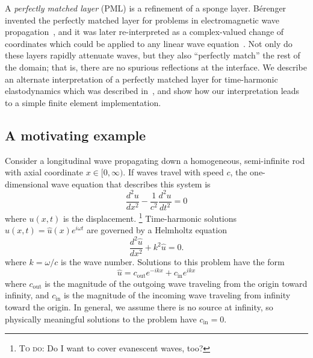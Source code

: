 \documentclass{article}
\newcommand{\note}[1]{\footnote{\textsc{To do}: #1}}
\begin{document}
A \emph{perfectly matched layer} (PML) is a refinement of a sponge
layer.  B{\'e}renger invented the perfectly matched layer for problems
in electromagnetic wave propagation~\cite{Berenger:1994:PML}, and it
was later re-interpreted as a complex-valued change of coordinates
which could be applied to any linear wave
equation~\cite{Turkel:1998:APB,Teixeira:2000:CSA}.  Not only do these
layers rapidly attenuate waves, but they also ``perfectly match'' the
rest of the domain; that is, there are no spurious reflections at the
interface.  We describe an alternate interpretation of a perfectly
matched layer for time-harmonic elastodynamics which was described
in~\cite{Basu:2003:PML}, and show how our interpretation leads to a
simple finite element implementation.



\subsection{A motivating example}

Consider a longitudinal wave propagating down a homogeneous,
semi-infinite rod with axial coordinate $x \in [0, \infty)$.  If waves
travel with speed $c$, the one-dimensional wave equation that
describes this system is
\begin{equation}
  \frac{d^2 u}{dx^2} - \frac{1}{c^2} \frac{d^2 u}{dt^2} = 0
\end{equation}
where $u(x,t)$ is the displacement.
\note{
  Do I want to cover evanescent waves, too?
}
Time-harmonic solutions $u(x,t) = \hat{u}(x) e^{i \omega t}$
are governed by a Helmholtz equation
\begin{equation}
  \label{helmholtz-eq-1d}
  \frac{d^2 \hat{u}}{dx^2} + k^2 \hat{u} = 0.
\end{equation}
where $k = \omega/c$ is the wave number.  Solutions to this problem
have the form
\begin{equation}
  \hat{u} = c_{\mathrm{out}} e^{-ikx} + c_{\mathrm{in}} e^{ikx}
\end{equation}
where $c_{\mathrm{out}}$ is the magnitude of the outgoing wave traveling
from the origin toward infinity, and $c_{\mathrm{in}}$ is the magnitude
of the incoming wave traveling from infinity toward the origin.
In general, we assume there is no source at infinity, so physically meaningful
solutions to the problem have $c_{\mathrm{in}} = 0$.
\end{document}

